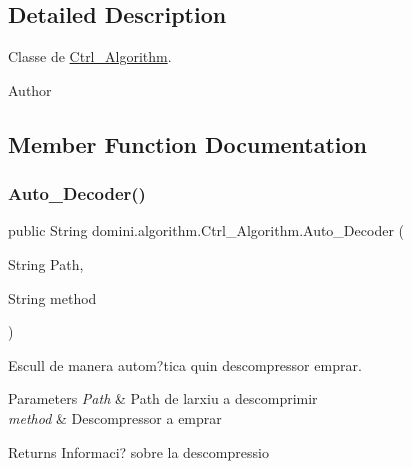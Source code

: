 \subsection{Detailed Description}
Classe de \hyperlink{classdomini_1_1algorithm_1_1Ctrl__Algorithm}{Ctrl\+\_\+\+Algorithm}. 

\begin{DoxyAuthor}{Author}

\end{DoxyAuthor}


\subsection{Member Function Documentation}
\mbox{\label{classdomini_1_1algorithm_1_1Ctrl__Algorithm_a613d15cc5326fc688b11d2c71ec9500a}} 
\subsubsection{\texorpdfstring{Auto\+\_\+\+Decoder()}{Auto\_Decoder()}}
{\footnotesize\ttfamily public String domini.\+algorithm.\+Ctrl\+\_\+\+Algorithm.\+Auto\+\_\+\+Decoder (\begin{DoxyParamCaption}\item[{String}]{Path,  }\item[{String}]{method }\end{DoxyParamCaption})\hspace{0.3cm}{\ttfamily [inline]}}



Escull de manera autom?tica quin descompressor emprar. 


\begin{DoxyParams}{Parameters}
{\em Path} & Path de l\textquotesingle{}arxiu a descomprimir \\
\hline
{\em method} & Descompressor a emprar \\
\hline
\end{DoxyParams}
\begin{DoxyReturn}{Returns}
Informaci? sobre la descompressio 
\end{DoxyReturn}
\mbox{\label{classdomini_1_1algorithm_1_1Ctrl__Algorithm_a6f7a706e07d4e6f8c1ea293d06e17318}} 
